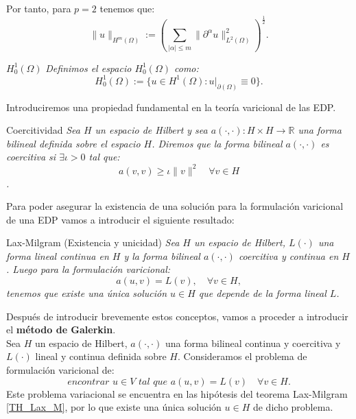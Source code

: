 Por tanto, para $p=2$ tenemos que:
\begin{equation}
    \|u\|_{H^{m}(\Omega)}:=(\sum_{|\alpha|\leq m}\|\partial^{\alpha}u\|^{2}_{L^{2}(\Omega)})^{\frac{1}{2}}.
\end{equation}

\begin{definicion1}{$H_{0}^{1}(\Omega)$}
\textit{Definimos el espacio $H_{0}^{1}(\Omega)$ como:
$$H_{0}^{1}(\Omega):=\{u\in H^{1}(\Omega):u|_{\partial(\Omega)}\equiv 0\}.$$
}
\end{definicion1}

Introduciremos una propiedad fundamental en la teoría varicional de las EDP.

\begin{definicion1}{Coercitividad}
\textit{Sea $H$ un espacio de Hilbert y sea $a(\cdot,\cdot):H \times H \longrightarrow \mathbb R$ una forma bilineal definida sobre el espacio $H$. Diremos que la forma bilineal $a(\cdot,\cdot)$ es coercitiva si $\exists \iota>0$ tal que:
$$a(v,v)\geq \iota \|v\|^{2} \quad \forall v\in H$$. 
}
\end{definicion1}

Para poder asegurar la existencia de una solución para la formulación varicional de una EDP vamos a introducir el siguiente resultado:

\begin{teorema1}{Lax-Milgram (Existencia y unicidad)}
\textit{Sea $H$ un espacio de Hilbert, $L(\cdot)$ una forma lineal continua en $H$ y la forma bilineal $a(\cdot,\cdot)$ coercitiva y continua en $H$. Luego para la formulación varicional:
$$a(u,v)=L(v), \quad \forall v\in H,$$ tenemos que existe una única solución $u\in H$ que depende de la forma lineal $L$.
}
\end{teorema1}\label{TH_Lax_M}

Después de introducir brevemente estos conceptos, vamos a proceder a introducir el \textbf{método de Galerkin}.\\

Sea $H$ un espacio de Hilbert, $a(\cdot,\cdot)$ una forma bilineal continua y coercitiva y $L(\cdot)$ lineal y continua definida sobre $H$. Consideramos el problema de formulación varicional de: \begin{equation}\label{problemagalerkin}
    \textit{encontrar $u\in V$ tal que $a(u,v)=L(v) \quad \forall  v\in H$}.
\end{equation}
Este problema variacional se encuentra en las hipótesis del teorema Lax-Milgram \ref{TH_Lax_M}, por lo que existe una única solución $u\in H$ de dicho problema.\\

